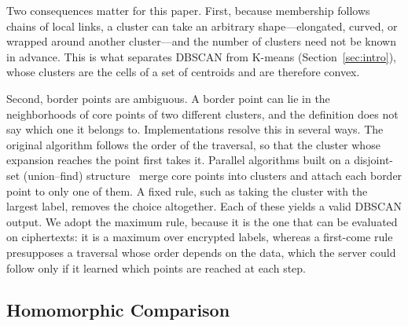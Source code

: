 Two consequences matter for this paper. First, because membership follows
chains of local links, a cluster can take an arbitrary shape---elongated,
curved, or wrapped around another cluster---and the number of clusters
need not be known in advance. This is what separates DBSCAN from
K-means (Section~\ref{sec:intro}), whose clusters are the cells of a set
of centroids and are therefore convex.

Second, border points are ambiguous. A border point can lie in the
neighborhoods of core points of two different clusters, and the
definition does not say which one it belongs to. Implementations resolve
this in several ways. The original algorithm follows the order of the
traversal, so that the cluster whose expansion reaches the point first
takes it. Parallel algorithms built on a disjoint-set (union--find)
structure~\cite{patwary2012new} merge core points into clusters and
attach each border point to only one of them. A fixed rule, such as
taking the cluster with the largest label, removes the choice altogether.
Each of these yields a valid DBSCAN output. We adopt the maximum rule, because it is the one that can be evaluated on
ciphertexts: it is a maximum over encrypted labels, whereas a first-come
rule presupposes a traversal whose order depends on the data, which the
server could follow only if it learned which points are reached at each
step.

\subsection{Homomorphic Comparison}
\label{sec:comparison}


